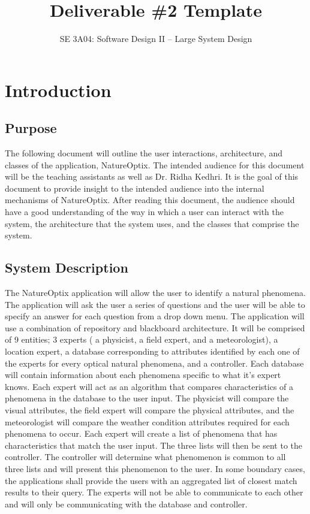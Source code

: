 \documentclass[]{article}
\title{Deliverable \#2 Template}
\author{SE 3A04: Software Design II -- Large System Design}
\date{}
\begin{document}
\maketitle	

\section{Introduction}
\label{sec:introduction}



\subsection{Purpose}
\label{sub:purpose}
The following document will outline the user interactions, architecture, and classes of the application, NatureOptix.  The intended audience for this document will be the teaching assistants as well as Dr. Ridha Kedhri. It is the goal of this document to provide insight to the intended audience into the internal mechanisms of NatureOptix. After reading this document, the audience should have a good understanding of the way in which a user can interact with the system, the architecture that the system uses, and the classes that comprise the system. 

\subsection{System Description}
\label{sub:system_description}
The NatureOptix application will allow the user to identify a natural phenomena. The application will ask the user a series of questions and the user will be able to specify an answer for each question from a drop down menu. The application will use a combination of repository and blackboard architecture. It will be comprised of 9 entities; 3 experts ( a physicist, a field expert, and a meteorologist), a location expert, a database corresponding to attributes identified by each one of the experts for every optical natural phenomena, and a controller. Each database will contain information about each phenomena specific to what it's expert knows. Each expert will act as an algorithm that compares characteristics of a phenomena in the database to the user input. The physicist will compare the visual attributes, the field expert will compare the physical attributes, and the meteorologist will compare the weather condition attributes required for each phenomena to occur. Each expert will create a list of phenomena that has characteristics that match the user input. The three lists will then be sent to the controller. The controller will determine what phenomenon is common to all three lists and will present this phenomenon to the user. In some boundary cases, the applications shall provide the users with an aggregated list of closest match results to their query. The experts will not be able to communicate to each other and will only be communicating with the database and controller. 
\end{document}
